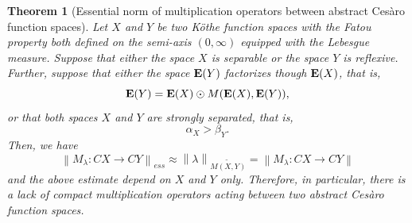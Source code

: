 \documentclass[11pt]{amsart}
\theoremstyle{definition}
\newtheorem{theorem}{Theorem}[section]
\theoremstyle{definition}
\theoremstyle{definition}
\theoremstyle{definition}
\theoremstyle{definition}
\theoremstyle{definition}
\theoremstyle{definition}
\theoremstyle{definition}
\numberwithin{equation}{section}
\numberwithin{equation}{section}
\numberwithin{equation}{section}
\theoremstyle{definition}
\theoremstyle{definition}
\theoremstyle{definition}
\theoremstyle{definition}
\theoremstyle{definition}
\theoremstyle{definition}
\newcommand{\norm}[1]{\left\lVert#1\right\rVert}
\begin{document}
\begin{theorem}[Essential norm of multiplication operators between abstract Ces{\` a}ro function spaces]\label{THM: ess norm Cezaro and Tandori function}
	{\it Let $X$ and $Y$ be two K{\" o}the function spaces with the Fatou property both defined on the semi-axis $(0,\infty)$ equipped with the Lebesgue measure.
		Suppose that either the space $X$ is separable or the space $Y$ is reflexive.
		Further, suppose that either the space ${\bf E}(Y)$ factorizes though ${\bf E}(X)$, that is,
		\begin{equation*}
			{\bf E}(Y) = {\bf E}(X) \odot M({\bf E}(X),{\bf E}(Y)),
		\end{equation*}
		or that both spaces $X$ and $Y$ are strongly separated, that is,
		\begin{equation*}
			\alpha_X > \beta_Y.
		\end{equation*}
		Then, we have
		\begin{equation*}
				\norm{M_{\lambda} \colon CX \rightarrow CY}_{ess}
					\approx \norm{\lambda}_{\widetilde{M(X,Y)}}
					= \norm{M_{\lambda} \colon CX \rightarrow CY}
		\end{equation*}
		and the above estimate depend on $X$ and $Y$ only.
		Therefore, in particular, there is a lack of compact multiplication operators acting between two abstract Ces{\` a}ro function spaces.}
\end{theorem}
\end{document}

